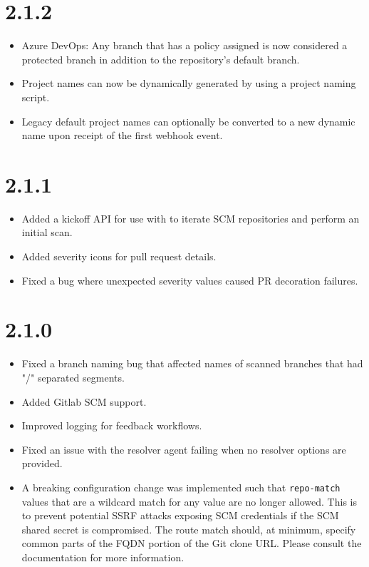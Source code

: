 \section{2.1.2}

\begin{itemize}
    \item Azure DevOps: Any branch that has a policy assigned is now considered
    a protected branch in addition to the repository's default branch.
    \item Project names can now be dynamically generated by using a project naming script.
    \item Legacy default project names can optionally be converted to a new dynamic name
    upon receipt of the first webhook event.
\end{itemize}

\section{2.1.1}

\begin{itemize}
    \item Added a kickoff API for use with 
          to iterate SCM repositories and perform an initial scan.
    \item Added severity icons for pull request details.
    \item Fixed a bug where unexpected severity values caused PR decoration failures.
\end{itemize}


\section{2.1.0}

\begin{itemize}
    \item Fixed a branch naming bug that affected names of scanned branches that had "/" separated segments.
    \item Added Gitlab SCM support.
    \item Improved logging for feedback workflows.
    \item Fixed an issue with the resolver agent failing when no resolver options are provided.
    \item A breaking configuration change was implemented such that \texttt{repo-match} values that are a wildcard
          match for any value are no longer allowed.  This is to prevent potential SSRF attacks exposing SCM credentials
          if the SCM shared secret is compromised.  The route match should, at minimum, specify common parts of the FQDN
          portion of the Git clone URL. Please consult the documentation for more information.
\end{itemize}



